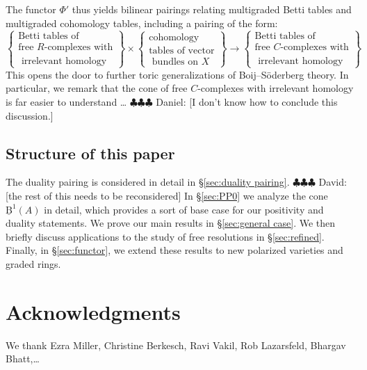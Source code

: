 \documentclass[12pt]{amsart}
\theoremstyle{definition}
\theoremstyle{remark}
\newcommand{\BBQ}{\underline{\mathrm{B}}}
\newcommand{\daniel}[1]{{\color{green} \sf $\clubsuit\clubsuit\clubsuit$ Daniel: [#1]}}
\newcommand{\david}[1]{{\color{red} \sf $\clubsuit\clubsuit\clubsuit$ David: [#1]}}
\begin{document}
The functor $\Phi'$ thus yields bilinear pairings relating multigraded Betti tables and multigraded cohomology tables, including a pairing of the form:
\begin{equation*}%
\label{eqn:multipairing}
%
\left\{\begin{matrix}
\text{Betti tables of} \\ \text{free $R$-complexes with}\\
\text{  irrelevant homology}\end{matrix}\right\}
%
\times 
%
\left\{\begin{matrix}
\text{cohomology }\\
\text{tables of vector}\\
\text{ bundles on } X
\end{matrix}\right\}
%
\longrightarrow
\left\{\begin{matrix}
\text{Betti tables of} \\ \text{free $C$-complexes with}\\
\text{  irrelevant homology}
\end{matrix}\right\}
\end{equation*}
This opens the door to further toric generalizations of Boij--S\"oderberg theory.  In particular, we remark that the cone of free $C$-complexes with irrelevant homology is far easier to understand \dots  \daniel{I don't know how to conclude this discussion.}

\subsection*{Structure of this paper} The duality pairing is considered in detail in \S\ref{sec:duality pairing}. \david{the rest of this needs to be reconsidered} In \S\ref{sec:PP0} we analyze the cone $\BBQ^1(A)$ in detail, which provides a sort of base case for our positivity and duality statements.  We prove our main results in \S\ref{sec:general case}.  We then briefly discuss applications to the study of free resolutions in \S\ref{sec:refined}.  Finally, in \S\ref{sec:functor}, we extend these results to new polarized varieties and graded rings.

\section*{Acknowledgments}
We thank Ezra Miller, Christine Berkesch, Ravi Vakil, Rob Lazarsfeld, Bhargav Bhatt,\dots
\end{document}
